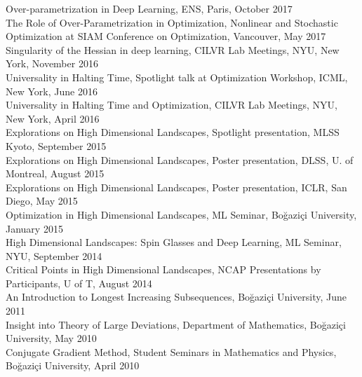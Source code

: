 \documentclass[10pt,letterpaper]{article}
\renewenvironment{itemize}
{
\begin{list}{}{\setlength{\leftmargin}{1.5em}}
}
{
  \end{list}
}
\begin{document}
\begin{itemize}
Over-parametrization in Deep Learning, ENS, Paris, October 2017 \\ 
The Role of Over-Parametrization in Optimization, Nonlinear and Stochastic Optimization at SIAM Conference on Optimization, Vancouver, May 2017 \\ 
Singularity of the Hessian in deep learning, CILVR Lab Meetings, NYU, New York, November 2016 \\ 
Universality in Halting Time, Spotlight talk at Optimization Workshop, ICML, New York, June 2016 \\ 
Universality in Halting Time and Optimization, CILVR Lab Meetings, NYU, New York, April 2016 \\ 
Explorations on High Dimensional Landscapes, Spotlight presentation, MLSS Kyoto, September 2015 \\ 
Explorations on High Dimensional Landscapes, Poster presentation, DLSS, U. of Montreal, August 2015 \\ 
Explorations on High Dimensional Landscapes, Poster presentation, ICLR, San Diego, May 2015 \\ 
Optimization in High Dimensional Landscapes, ML Seminar, Bo\u{g}azi\c{c}i University, January 2015 \\ 
High Dimensional Landscapes: Spin Glasses and Deep Learning, ML Seminar, NYU, September 2014 \\ 
Critical Points in High Dimensional Landscapes, NCAP Presentations by Participants, U of T, August 2014 \\ 
An Introduction to Longest Increasing Subsequences, Bo\u{g}azi\c{c}i University, June 2011 \\ 
Insight into Theory of Large Deviations, Department of Mathematics, Bo\u{g}azi\c{c}i University, May 2010 \\ 
Conjugate Gradient Method, Student Seminars in Mathematics and Physics, Bo\u{g}azi\c{c}i University, April 2010
\end{itemize}
\end{document}
